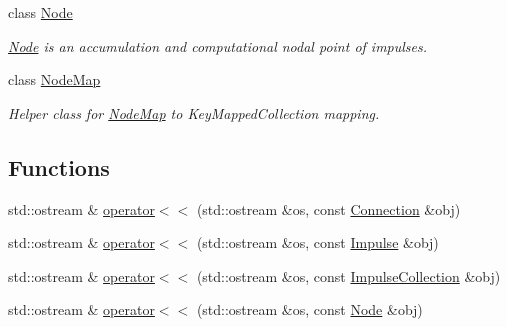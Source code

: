 \begin{DoxyCompactItemize}
class \hyperlink{classcryomesh_1_1components_1_1Node}{\-Node}
\begin{DoxyCompactList}\small\item\em \hyperlink{classcryomesh_1_1components_1_1Node}{\-Node} is an accumulation and computational nodal point of impulses. \end{DoxyCompactList}\item 
class \hyperlink{classcryomesh_1_1components_1_1NodeMap}{\-Node\-Map}
\begin{DoxyCompactList}\small\item\em \-Helper class for \hyperlink{classcryomesh_1_1components_1_1NodeMap}{\-Node\-Map} to \-Key\-Mapped\-Collection mapping. \end{DoxyCompactList}\end{DoxyCompactItemize}
\subsection*{\-Functions}
\begin{DoxyCompactItemize}
\item 
std\-::ostream \& \hyperlink{namespacecryomesh_1_1components_a2407f0942f1623e6cb795553fa4eec7b}{operator$<$$<$} (std\-::ostream \&os, const \hyperlink{classcryomesh_1_1components_1_1Connection}{\-Connection} \&obj)
\item 
std\-::ostream \& \hyperlink{namespacecryomesh_1_1components_acda27209fe63cde02e1349a902e45d76}{operator$<$$<$} (std\-::ostream \&os, const \hyperlink{classcryomesh_1_1components_1_1Impulse}{\-Impulse} \&obj)
\item 
std\-::ostream \& \hyperlink{namespacecryomesh_1_1components_afc599531f192027048e4f451f3e81a89}{operator$<$$<$} (std\-::ostream \&os, const \hyperlink{classcryomesh_1_1components_1_1ImpulseCollection}{\-Impulse\-Collection} \&obj)
\item 
std\-::ostream \& \hyperlink{namespacecryomesh_1_1components_a34840c34dc560387163b72e367d62f8a}{operator$<$$<$} (std\-::ostream \&os, const \hyperlink{classcryomesh_1_1components_1_1Node}{\-Node} \&obj)
\end{DoxyCompactItemize}


